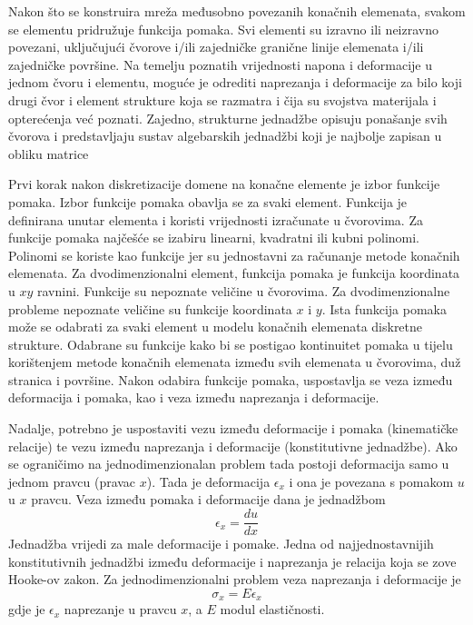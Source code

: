 \documentclass[a4paper,twoside,12pt]{memoir} %
\begin{document}
Nakon što se konstruira mreža međusobno povezanih konačnih elemenata, svakom se elementu pridružuje funkcija pomaka. Svi elementi su izravno ili neizravno povezani, uključujući čvorove i/ili zajedničke granične linije elemenata i/ili zajedničke površine.
Na temelju poznatih vrijednosti napona i deformacije u jednom čvoru i elementu, moguće je odrediti naprezanja i deformacije za bilo koji drugi čvor i element strukture koja se razmatra i čija su svojstva materijala i opterećenja već poznati. Zajedno, strukturne jednadžbe opisuju ponašanje svih čvorova i predstavljaju sustav algebarskih jednadžbi koji je najbolje zapisan u obliku matrice \par

Prvi korak nakon diskretizacije domene na konačne elemente je izbor funkcije pomaka. Izbor funkcije pomaka obavlja se za svaki element. Funkcija je definirana unutar elementa i koristi vrijednosti izračunate u čvorovima. Za funkcije pomaka najčešće se izabiru linearni, kvadratni ili kubni polinomi. Polinomi se koriste kao funkcije jer su jednostavni za računanje metode konačnih elemenata. Za dvodimenzionalni element, funkcija pomaka je funkcija koordinata u $xy$ ravnini. Funkcije su nepoznate veličine u čvorovima. Za dvodimenzionalne probleme nepoznate veličine su funkcije koordinata $x$ i $y$.
Ista funkcija pomaka može se odabrati za svaki element u modelu konačnih elemenata diskretne strukture. Odabrane su funkcije kako bi se postigao kontinuitet pomaka u tijelu korištenjem metode konačnih elemenata između svih elemenata u čvorovima, duž stranica i površine. Nakon odabira funkcije pomaka, uspostavlja se veza između deformacija i pomaka, kao i veza između naprezanja i deformacije. \par

Nadalje, potrebno je uspostaviti vezu između deformacije i pomaka (kinematičke relacije) te vezu između naprezanja i deformacije (konstitutivne jednadžbe). Ako se ograničimo na jednodimenzionalan problem tada postoji deformacija samo u jednom pravcu (pravac $x$). Tada je deformacija $\epsilon_x$ i ona je povezana s pomakom $u$ u $x$ pravcu. Veza između pomaka i deformacije dana je jednadžbom
\begin{equation}
    \label{eq:veza_pomaka_deformacije}
	\epsilon_x = \frac{du}{dx}
\end{equation}
Jednadžba vrijedi za male deformacije i pomake. Jedna od najjednostavnijih konstitutivnih jednadžbi između deformacije i naprezanja je relacija koja se zove Hooke-ov zakon. Za jednodimenzionalni problem veza naprezanja i deformacije je 
\begin{equation}
    \label{eq:veza_naprezanja_deformacije}
    \sigma_x = E  \epsilon_x
\end{equation}
gdje je $\epsilon_x$ naprezanje u pravcu $x$, a $E$ modul elastičnosti. \par
\end{document}
